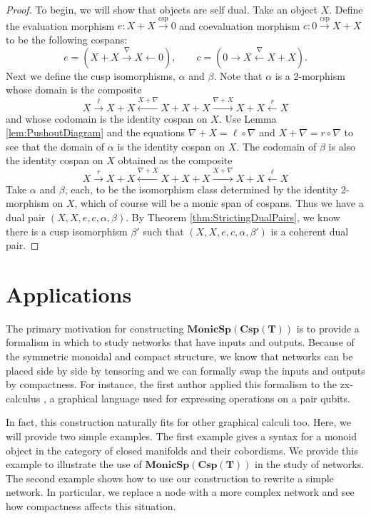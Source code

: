 \documentclass[11pt]{amsart}
\newcommand{\from}{\colon}
\newcommand{\xto}[1]{\xrightarrow{#1}}
\newcommand{\tocospan}{\xrightarrow{\mathrm{csp}}}
\newcommand{\bimonspcsp}[1]{\mathbf{MonicSp(Csp(#1))}}
\theoremstyle{remark}
\theoremstyle{definition}
\begin{document}
\begin{proof}
	To begin, we will show that objects are self dual. 
	Take an object $X$.  
	Define the evaluation morphism 
		$e \from X + X \tocospan 0$ 
	and coevaluation morphism 
		$c \from 0 \tocospan X+X$ 
	to be the following cospans:
	\[
		e = (X+X \xto{\nabla} X \gets 0), 
		\quad \quad 
		c = (0 \to X \xleftarrow{\nabla} X+X).
	\]
	Next we define the cusp isomorphisms, 
		$\alpha$ and $\beta$.
	Note that $\alpha$ is a 2-morphism 
	whose domain is the composite 
	\[
		X \xto{\ell}
		X+X \xleftarrow{X+\nabla}
		X+X+X \xto{\nabla +X}
		X+X \xleftarrow{r}
		X
	\]
	and whose codomain is the identity cospan on $X$.  
	Use Lemma \ref{lem:PushoutDiagram} 
	and the equations
		$\nabla+X = \ell \circ \nabla$ 
	and 
		$X + \nabla = r \circ \nabla$ 
	to see that the domain of $\alpha$ is 
	the identity cospan on $X$.  
	The codomain of $\beta$ is also 
	the identity cospan on $X$
	obtained as the composite 
	\[
		X \xto{r}
		X+X \xleftarrow{\nabla+X}
		X+X+X \xto{X+\nabla}
		X+X \xleftarrow{\ell}
		X
	\]
	Take $\alpha$ and $\beta$, each, 
	to be the isomorphism class determined by the identity 2-morphism on $X$, which of course will be a monic span of cospans.
	Thus we have a dual pair 
		$(X,X,e,c,\alpha,\beta)$. 
	By Theorem 
		\ref{thm:StrictingDualPairs}, 
	we know there is a cusp isomorphism $\beta'$ 
	such that 
		$(X,X,e,c,\alpha,\beta')$ 
	is a coherent dual pair.  
\end{proof}

\section{Applications} %
\label{sec:Applications}

The primary motivation for constructing $\bimonspcsp{T}$
is to provide a formalism in which to study networks
that have inputs and outputs.
Because of the symmetric monoidal and compact structure,
we know that networks can be placed side by side 
by tensoring and we can formally swap the inputs
and outputs by compactness. 
For instance, the first author applied this formalism
to the zx-calculus \cite{Cic_zx}, a graphical
language used for expressing operations
on a pair qubits.

In fact, this construction naturally 
fits for other graphical calculi too. 
Here, we will provide two simple examples.
The first example gives a syntax
for a monoid object in the category
of closed manifolds and their cobordisms.
We provide this example to illustrate 
the use of $\bimonspcsp{T}$ in the 
study of networks.
The second example shows how to use 
our construction to rewrite a simple
network. In particular, we replace
a node with a more complex network
and see how compactness affects
this situation.  
\end{document}

